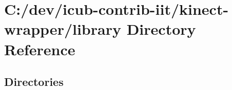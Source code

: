 \section{C\+:/dev/icub-\/contrib-\/iit/kinect-\/wrapper/library Directory Reference}
\label{dir_e3d620c6b6fdb93ed3bc6186215bde2e}
\subsection*{Directories}
\begin{DoxyCompactItemize}
\end{DoxyCompactItemize}
